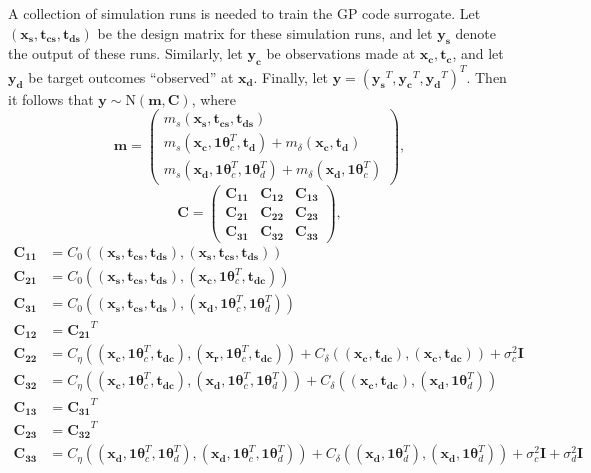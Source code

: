 \documentclass[12pt]{article}
\begin{document}
%
A collection of simulation runs is needed to train the GP code surrogate.
%
Let $(\mathbf{x_s},\mathbf{t_{cs}},\mathbf{t_{ds}})$ be the design matrix for these simulation runs, and let $\mathbf{y_s}$ denote the output of these runs.
%
Similarly, let $\mathbf{y_c}$ be observations made at $\mathbf{x_c},\mathbf{t_{c}}$, and let $\mathbf {y_d}$ be target outcomes ``observed'' at $\mathbf {x_d}$.
%
Finally, let $\mathbf y = (\mathbf{y_s}^T,\mathbf{y_c}^T,\mathbf{y_d}^T)^T$.
%
Then it follows that $\mathbf y\sim \mathrm{N}(\mathbf m,\mathbf C)$, where
\[
\mathbf m = \begin{pmatrix}
m_s(\mathbf{x_s},\mathbf{t_{cs}},\mathbf{t_{ds}})\\
m_s(\mathbf{x_c},\mathbf1\boldsymbol\theta_c^T,\mathbf{t_{d}}) + m_\delta(\mathbf{x_c},\mathbf{t_{d}})\\
m_s(\mathbf{x_d},\mathbf1\boldsymbol\theta_c^T,\mathbf1\boldsymbol\theta_d^T) + m_\delta(\mathbf{x_d},\mathbf1\boldsymbol\theta_c^T)
\end{pmatrix},
\]
\[
\mathbf C = \begin{pmatrix}
\mathbf{C_{11}} & \mathbf{C_{12}} & \mathbf{C_{13}}\\
\mathbf{C_{21}} & \mathbf{C_{22}} & \mathbf{C_{23}}\\
\mathbf{C_{31}} & \mathbf{C_{32}} & \mathbf{C_{33}}
\end{pmatrix},
\]
\begin{align*}
\mathbf{C_{11}}&=C_0\left((\mathbf{x_s},\mathbf{t_{cs}},\mathbf{t_{ds}}),(\mathbf{x_s},\mathbf{t_{cs}},\mathbf{t_{ds}})\right)\\
\mathbf{C_{21}}&=C_0\left((\mathbf{x_s},\mathbf{t_{cs}},\mathbf{t_{ds}}),(\mathbf{x_c},\mathbf1\boldsymbol\theta_c^T,\mathbf{t_{dc}})\right)\\
\mathbf{C_{31}}&=C_0\left((\mathbf{x_s},\mathbf{t_{cs}},\mathbf{t_{ds}}),(\mathbf{x_d},\mathbf1\boldsymbol\theta_c^T,\mathbf1\boldsymbol\theta_d^T)\right)\\
\mathbf{C_{12}}&=\mathbf{C_{21}}^T\\
\mathbf{C_{22}}&=C_\eta\left((\mathbf{x_c},\mathbf1\boldsymbol\theta_c^T,\mathbf{t_{dc}}),(\mathbf{x_r},\mathbf1\boldsymbol\theta_c^T,\mathbf{t_{dc}})\right) + C_\delta\left( (\mathbf{x_c},\mathbf{t_{dc}}),(\mathbf{x_c},\mathbf{t_{dc}}) \right) + \sigma^2_c \mathbf I\\
\mathbf{C_{32}}&=C_\eta\left((\mathbf{x_c},\mathbf1\boldsymbol\theta_c^T,\mathbf{t_{dc}}),(\mathbf{x_d},\mathbf1\boldsymbol\theta_c^T,\mathbf1\boldsymbol\theta_d^T)\right) + C_\delta\left( (\mathbf{x_c},\mathbf{t_{dc}}),(\mathbf{x_d},\mathbf1\boldsymbol\theta_d^T) \right)\\
\mathbf{C_{13}}&=\mathbf{C_{31}}^T\\
\mathbf{C_{23}}&=\mathbf{C_{32}}^T\\
\mathbf{C_{33}}&=C_\eta\left((\mathbf{x_d},\mathbf1\boldsymbol\theta_c^T,\mathbf1\boldsymbol\theta_d^T),(\mathbf{x_d},\mathbf1\boldsymbol\theta_c^T,\mathbf1\boldsymbol\theta_d^T)\right) + C_\delta\left( (\mathbf{x_d},\mathbf1\boldsymbol\theta_d^T),(\mathbf{x_d},\mathbf1\boldsymbol\theta_d^T) \right) + \sigma^2_c\mathbf I + \sigma^2_d \mathbf I
\end{align*}
\end{document}
